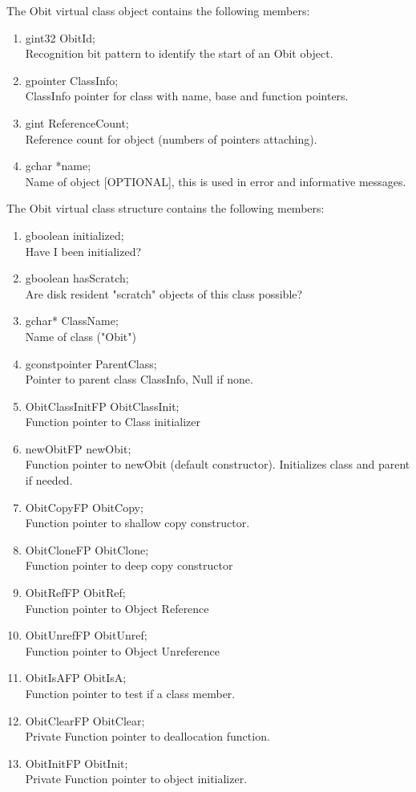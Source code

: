 \documentclass[11pt]{article}
\begin{document}
The Obit virtual class object contains the following members:
\begin{enumerate}
\item gint32 ObitId;\\
 Recognition bit pattern to identify the start of an Obit object.
\item gpointer ClassInfo;\\
ClassInfo pointer for class with name, base and function pointers.
\item gint ReferenceCount;\\
 Reference count for object (numbers of pointers attaching).
\item gchar *name;\\
 Name of object [OPTIONAL], this is used in error and informative messages.
\end{enumerate}

The Obit virtual class structure contains the following members:
\begin{enumerate}
\item gboolean initialized;\\
Have I been initialized?
\item gboolean hasScratch;\\
 Are disk resident "scratch" objects of this class possible?
\item gchar* ClassName;\\
Name of class ("Obit")
\item gconstpointer ParentClass;\\
Pointer to parent class ClassInfo, Null if none.
\item ObitClassInitFP ObitClassInit;\\
 Function pointer to Class initializer
\item newObitFP newObit;\\
Function pointer to newObit (default constructor).
Initializes class and parent if needed.
\item ObitCopyFP ObitCopy;\\
 Function pointer to shallow copy constructor.
\item ObitCloneFP ObitClone;\\
Function pointer to deep copy constructor
\item ObitRefFP ObitRef;\\
Function pointer to Object Reference
\item ObitUnrefFP ObitUnref;\\
Function pointer to Object Unreference
\item ObitIsAFP ObitIsA;\\
Function pointer to test if a class member.
\item ObitClearFP ObitClear;\\
Private Function pointer to deallocation function.
\item ObitInitFP ObitInit;\\
Private Function pointer to object initializer.
\end{enumerate}
\end{document}
